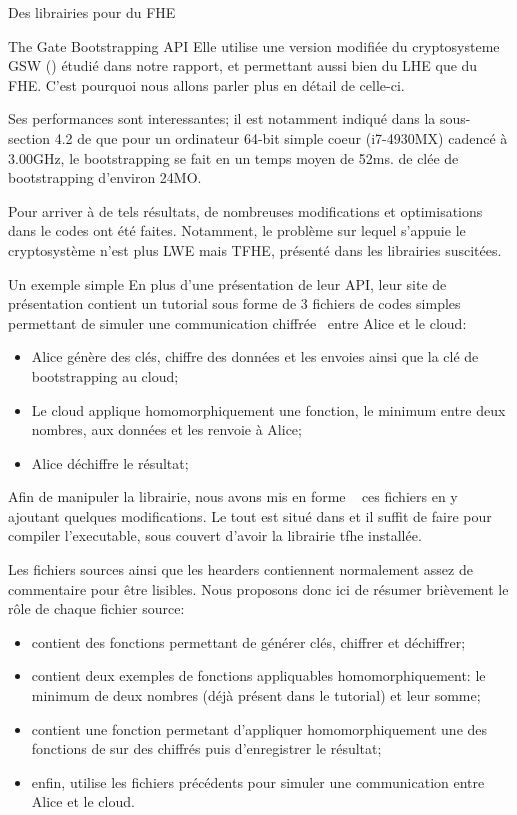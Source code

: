 \begin{section}{Des librairies pour du FHE}
\begin{subsection}{The Gate Bootstrapping API}
Elle utilise une version modifiée du cryptosysteme GSW (\cite{C:GenSahWat13})
étudié dans notre rapport, et permettant aussi bien du LHE que du FHE. C'est
pourquoi nous allons parler plus en détail de celle-ci.

Ses performances sont interessantes; il est notamment indiqué dans la sous-section
4.2 de \cite{cryptoeprint:2016:870} que pour un ordinateur 64-bit simple coeur 
(i7-4930MX) cadencé à 3.00GHz, le bootstrapping se fait en un temps moyen de 52ms.
de clée de bootstrapping d'environ 24MO.

Pour arriver à de tels résultats, de nombreuses modifications et optimisations dans le codes 
ont été faites. Notamment, le problème sur lequel s'appuie le cryptosystème n'est plus 
LWE mais TFHE, présenté dans les librairies suscitées.

\begin{subsubsection}{Un exemple simple}
En plus d'une présentation de leur API, leur site de présentation
contient un tutorial sous forme de 3 fichiers de codes simples 
permettant de simuler une \og communication chiffrée\fg~ entre Alice et le cloud:
\begin{itemize}
\item Alice génère des clés, chiffre des données et les envoies ainsi
	que la clé de bootstrapping au cloud;
\item Le cloud applique homomorphiquement une fonction, le minimum
	entre deux nombres, aux données et les renvoie à Alice;
\item Alice déchiffre le résultat;
\end{itemize}
Afin de manipuler la librairie, nous avons \og mis en forme \fg~ ces fichiers
en y ajoutant quelques modifications. Le tout est situé dans 
 et il suffit de faire  
pour compiler l'executable, sous couvert d'avoir la librairie tfhe installée.
	
Les fichiers sources ainsi que les hearders contiennent normalement assez de
commentaire pour être lisibles. Nous proposons donc ici de résumer brièvement 
le rôle de chaque fichier source:
\begin{itemize}
\item {} contient des fonctions permettant de générer
clés, chiffrer et déchiffrer;
\item {} contient deux exemples de fonctions 
appliquables homomorphiquement: le minimum de deux nombres (déjà 
présent dans le tutorial) et leur somme;
\item {} contient une fonction permetant d'appliquer 
homomorphiquement une des fonctions de 
sur des chiffrés puis d'enregistrer le résultat;
\item enfin,  utilise les fichiers précédents
	pour simuler une communication entre Alice et le cloud.
\end{itemize}



\end{subsubsection}
\end{subsection}
\end{section}

